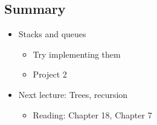 \documentclass[10pt]{article}
\begin{document}
\subsection*{Summary}
\begin{itemize}
    \item Stacks and queues
    \begin{itemize}
        \item Try implementing them
        \item Project 2
    \end{itemize}
    \item Next lecture: Trees, recursion
    \begin{itemize}
        \item Reading: Chapter 18, Chapter 7
    \end{itemize}
\end{itemize}
\end{document}

